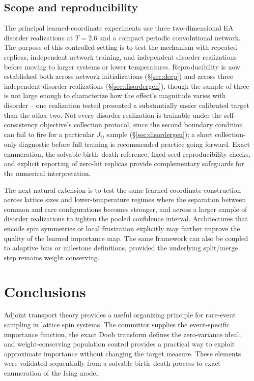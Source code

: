 \documentclass[a4paper,fleqn]{cas-sc}
\begin{document}
\subsection{Scope and reproducibility}\label{sec:limits}
The principal learned-coordinate experiments use three two-dimensional EA disorder realizations at $T=2.6$ and a compact periodic convolutional network. The purpose of this controlled setting is to test the mechanism with repeated replicas, independent network training, and independent disorder realizations before moving to larger systems or lower temperatures. Reproducibility is now established both across network initializations (\S\ref{sec:deep}) and across three independent disorder realizations (\S\ref{sec:disordergen}), though the sample of three is not large enough to characterize how the effect's magnitude varies with disorder -- one realization tested presented a substantially easier calibrated target than the other two. Not every disorder realization is trainable under the self-consistency objective's collection protocol, since the second boundary condition can fail to fire for a particular $J_{ij}$ sample (\S\ref{sec:disordergen}); a short collection-only diagnostic before full training is recommended practice going forward. Exact enumeration, the solvable birth--death reference, fixed-seed reproducibility checks, and explicit reporting of zero-hit replicas provide complementary safeguards for the numerical interpretation.

The next natural extension is to test the same learned-coordinate construction across lattice sizes and lower-temperature regimes where the separation between common and rare configurations becomes stronger, and across a larger sample of disorder realizations to tighten the pooled confidence interval. Architectures that encode spin symmetries or local frustration explicitly may further improve the quality of the learned importance map. The same framework can also be coupled to adaptive bins or milestone definitions, provided the underlying split/merge step remains weight conserving.

\section{Conclusions}
Adjoint transport theory provides a useful organizing principle for rare-event sampling in lattice spin systems. The committor supplies the event-specific importance function, the exact Doob transform defines the zero-variance ideal, and weight-conserving population control provides a practical way to exploit approximate importance without changing the target measure. These elements were validated sequentially from a solvable birth--death process to exact enumeration of the Ising model.
\end{document}
